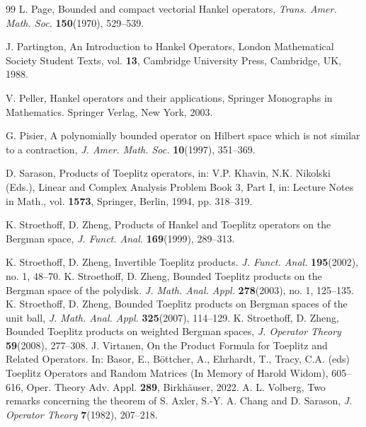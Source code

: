 \documentclass{article}%
\begin{document}
\begin{thebibliography}{99}
L. Page, Bounded and compact vectorial Hankel operators,
\textsl{Trans. Amer. Math. Soc.} \textbf{150}(1970), 529--539.

J. Partington, An Introduction to Hankel Operators, London
Mathematical Society Student Texts, vol. \textbf{13}, Cambridge University
Press, Cambridge, UK, 1988.

V. Peller, Hankel operators and their applications, Springer
Monographs in Mathematics. Springer Verlag, New York, 2003.

G. Pisier, A polynomially bounded operator on Hilbert space
which is not similar to a contraction, \textsl{J. Amer. Math. Soc.}
\textbf{10}(1997), 351--369.

D. Sarason, Products of Toeplitz operators, in: V.P.
Khavin, N.K. Nikolski (Eds.), Linear and Complex Analysis Problem Book 3, Part
I, in: Lecture Notes in Math., vol. \textbf{1573}, Springer, Berlin, 1994, pp. 318--319.

K. Stroethoff, D. Zheng, Products of Hankel and Toeplitz
operators on the Bergman space, \textsl{J. Funct. Anal.} \textbf{169}(1999), 289--313.

K. Stroethoff, D. Zheng,  Invertible Toeplitz products. \textsl{J. Funct. Anal.} \textbf{195}(2002), no. 1, 48–70.
K. Stroethoff, D. Zheng, Bounded Toeplitz products on the Bergman space of the polydisk. \textsl{J. Math. Anal. Appl.} \textbf{278}(2003), no. 1, 125–135.
K. Stroethoff, D. Zheng,  Bounded Toeplitz products on Bergman spaces of the unit ball, \textsl{J. 
Math. Anal. Appl.} \textbf{325}(2007), 114–129.
K. Stroethoff, D. Zheng,  Bounded Toeplitz products on weighted Bergman spaces, \textsl{J. 
Operator Theory} \textbf{59}(2008), 277–308.
 J. Virtanen, On the Product Formula for Toeplitz and Related Operators. In: Basor, E., B\"{o}ttcher, A., Ehrhardt, T., Tracy, C.A. (eds) Toeplitz Operators and Random Matrices (In Memory of Harold Widom), 605--616, Oper. Theory Adv. Appl. \textbf{289}, Birkh\"{a}user, 2022.
 A. L. Volberg, Two remarks concerning the theorem of S. Axler, S.-Y. A. Chang and D. Sarason, \textsl{J. Operator Theory} \textbf{7}(1982), 207--218.



\end{thebibliography}
\end{document}
